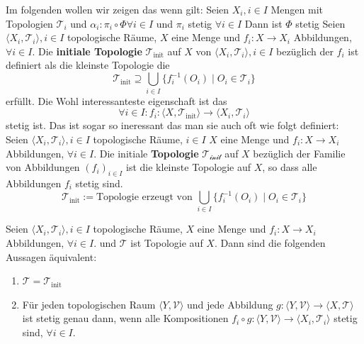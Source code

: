 Im folgenden wollen wir zeigen das wenn gilt: 
Seien $X_i, i \in I$ Mengen mit Topologien $\mathcal{T}_i$ und 
$\alpha_{i}: \pi_i \circ \Phi \forall i \in I$ und $\pi_i$ stetig $\forall i \in I$
Dann ist $\Phi$ stetig
\dfn{}
{
    Seien $\langle X_i,\mathcal{T}_i \rangle, i \in I$ topologische Räume, $X$ eine Menge
    und $f_i: X \to X_i$ Abbildungen, $\forall i \in I$.
    Die \textbf{initiale Topologie} $\mathcal{T}_{\text{init}}$ auf $X$ von $\langle X_i,\mathcal{T}_i\rangle, i \in I$ 
    bezüglich der $f_i$ ist definiert als die kleinste Topologie die 
    $$ 
    \mathcal{T}_{\text{init}} \supseteq \bigcup_{i \in I}\{f_i^{-1}(O_i) \mid O_i \in \mathcal{T}_i\}
    $$
    erfüllt.
}
    Die Wohl interessanteste eigenschaft ist das 
$$\forall i \in I: f_i: \langle X, \mathcal{T}_{\text{init}} 
\rangle \to \langle X_i, \mathcal{T}_i \rangle$$ stetig ist. Das ist sogar
so ineressant das man sie auch oft wie folgt definiert:
\dfn{}
{
    Seien $\langle X_i,\mathcal{T}_i \rangle, i \in I$ topologische Räume, $i \in I$
    $X$ eine Menge und $f_i: X \to X_i$ Abbildungen, $\forall i \in I$.
    Die initiale \textbf{Topologie} $\mathcal{T_{\text{init}}}$ auf $X$ bezüglich der Familie von Abbildungen 
    $(f_i)_{i \in I}$ ist die kleinste Topologie auf $X$, so dass alle Abbildungen $f_i$ stetig sind.   
    $$
     \mathcal{T}_{\text{init}} := \text{Topologie erzeugt von } \bigcup_{i \in I}\{f_i^{-1}(O_i) \mid O_i \in \mathcal{T}_i\} 
    $$
}


\thm{}
{
    Seien $\langle X_i,\mathcal{T}_i \rangle,  i \in I$ topologische Räume, $X$ eine Menge und 
    $f_i: X \to X_i$ Abbildungen, $\forall i \in I$. und $\mathcal{T}$ ist Topologie auf $X$.
    Dann sind die folgenden Aussagen äquivalent:
    \begin{enumerate}
        \item[(i)] $\mathcal{T} = \mathcal{T}_{\text{init}}$
        \item[(ii)] Für jeden topologischen Raum $\langle Y, \mathcal{V} \rangle$ und jede Abbildung 
        $g: \langle Y, \mathcal{V} \rangle \to \langle X, \mathcal{T} \rangle$ ist stetig genau dann, wenn alle Kompositionen 
        $f_i \circ g: \langle Y, \mathcal{V} \rangle \to \langle X_i, \mathcal{T}_i \rangle$ stetig sind, $\forall i \in I$.
    \end{enumerate}
}

